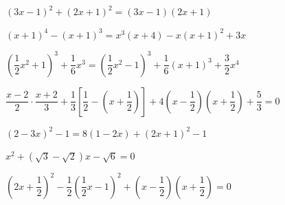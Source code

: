 \begin{esercizio}[*]
\begin{enumeratea}
\item \((3 x-1)^{2} + (2 x + 1)^{2} = (3 x-1) (2 x + 1)\)
\sol{\emptyset}
\item \((x + 1)^{4}-(x + 1)^{3} = x^{3} (x + 4)-x (x + 1)^{2} + 3 x\)
\item \(\left(\dfrac{1}{2} x^{2} + 1 \right)^{3} + \dfrac{1}{6} x^{3} = 
\left(\dfrac{1}{2} x^{2}-1 \right)^{3} + \dfrac{1}{6} (x + 1)^{3} + 
\dfrac{3}{2} x^{4}\)
\item \(\dfrac{x-2}{2} \cdot \dfrac{x + 2}{3} + \dfrac{1}{3} 
\left[\dfrac{1}{2}-\left(x + \dfrac{1}{2} \right) \right] + 4 \left(x 
-\dfrac{1}{2} 
\right) \left(x + \dfrac{1}{2} \right) + \dfrac{5}{3} = 0\)
\item \((2-3 x)^{2}-1 = 8 (1-2 x) + (2 x + 1)^{2}-1\)
\item \(x^{2} + \left(\sqrt{3}-\sqrt{2} \right) x-\sqrt{6} = 0\)
\item \(\left(2 x + \dfrac{1}{2} \right)^{2}-\dfrac{1}{2} 
      \left(\dfrac{1}{2} x-1 \right)^{2} + \left(x-\dfrac{1}{2} \right) 
      \left(x + \dfrac{1}{2} \right) = 0\)
\end{enumeratea}
\end{esercizio}

